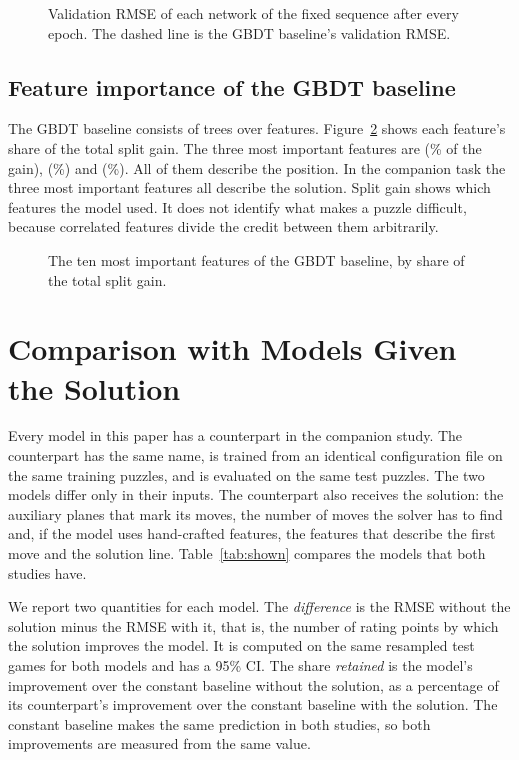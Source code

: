 \documentclass[11pt]{article}
\begin{document}
\begin{figure}[htbp]\centering
{}
\caption{Validation RMSE of each network of the fixed sequence after every
epoch. The dashed line is the GBDT baseline's validation RMSE.}
\label{fig:curves}
\end{figure}

\subsection{Feature importance of the GBDT baseline}

The GBDT baseline consists of  trees over
 features. Figure~\ref{fig:leans} shows each feature's
share of the total split gain. The three most important features are
 (\% of the gain),
 (\%) and
 (\%). All of them
describe the position. In the companion task the three most important
features all describe the solution. Split gain shows which features the model
used. It does not identify what makes a puzzle difficult,
because correlated features divide the credit between them arbitrarily.

\begin{figure}[htbp]\centering
{}
\caption{The ten most important features of the GBDT baseline, by share of
the total split gain.}
\label{fig:leans}
\end{figure}

\ifshown
\section{Comparison with Models Given the Solution}
\label{sec:shown}

Every model in this paper has a counterpart in the companion study. The
counterpart has the same name, is trained from an identical configuration
file on the same training puzzles, and is evaluated on the same test
puzzles. The two models differ only in their inputs. The counterpart also
receives the solution: the auxiliary planes that mark its moves, the number
of moves the solver has to find and, if the model uses hand-crafted features,
the features that describe the first move and the solution line.
Table~\ref{tab:shown} compares the  models that both studies
have.

We report two quantities for each model. The \emph{difference} is the RMSE
without the solution minus the RMSE with it, that is, the number of rating
points by which the solution improves the model.
\ifshownpaired
It is computed on the same resampled test games for both models and has a
95\% CI.
\fi
The share \emph{retained} is the model's improvement over the constant
baseline without the solution, as a percentage of its counterpart's
improvement over the constant baseline with the solution. The constant
baseline makes the same prediction in both studies, so both improvements are
measured from the same value.
\end{document}
